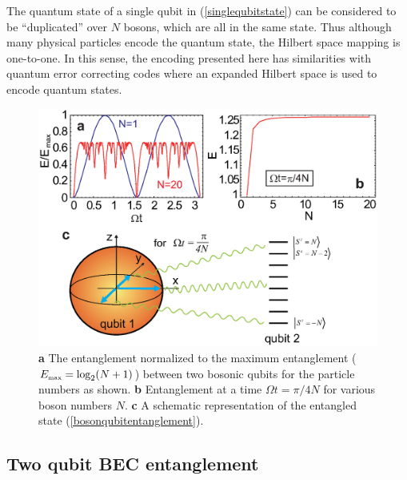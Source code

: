 \documentclass[
aps,%
12pt,%
final,%
notitlepage,%
oneside,%
onecolumn,%
nobibnotes,%
nofootinbib,%
superscriptaddress,%
noshowpacs,%
centertags]%
{revtex4}
\begin{document}
The quantum state of a single qubit in (\ref{singlequbitstate}) can be considered to be ``duplicated'' over $ N $ bosons, which are all in the same state.  Thus although many physical particles encode the quantum state, the Hilbert space mapping is one-to-one.  In this sense, the encoding presented here has similarities with quantum error correcting codes where an expanded Hilbert space is used to encode quantum states.  

\begin{figure}[t!]
\setcaptionmargin{5mm}
\onelinecaptionsfalse
\begin{center}
    \includegraphics[width=13cm]{fig1.eps}
\end{center}
\label{fig1:entanglement}
\caption{
    {\bf a} The entanglement normalized to the maximum entanglement ($E_{\mbox{\tiny max}} = \log_2 (N+1) $) between two bosonic qubits for the particle numbers as shown. 
    {\bf b} Entanglement at a time $ \Omega t= \pi/4N $ for various boson numbers $ N $.  
    {\bf c} A schematic representation of the entangled state (\ref{bosonqubitentanglement}). 
}
\end{figure}




\subsection{Two qubit BEC entanglement}
\end{document}
